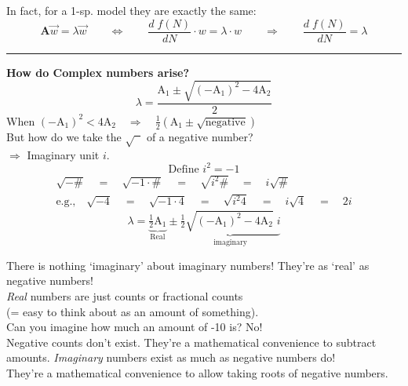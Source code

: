 \documentclass{article}
\newcommand{\ind}{\-\hspace{1cm}}
\begin{document}
In fact, for a 1-sp. model they are exactly the same:\\
\begin{equation*}
	\mathbf{A} \vec{w} = \lambda \vec{w} \qquad \Leftrightarrow \qquad \frac{d \; f(N)}{d N} \cdot  w  = \lambda \cdot w \qquad \Rightarrow \qquad \frac{d \; f(N)}{d N} = \lambda
\end{equation*}

\rule[0.5ex]{\linewidth}{1pt}

\textbf{How do Complex numbers arise?}\\
\begin{equation*}
	\lambda = \frac{\text{A}_1 \pm \sqrt{(-\text{A}_1)^2 - 4\text{A}_2}}{2}
\end{equation*}
When $(-\text{A}_1)^2 < 4 \text{A}_2  \quad \Rightarrow \quad \tfrac{1}{2}(\text{A}_1\pm \sqrt{\text{negative}})$\\
But how do we take the $\sqrt{\phantom{x}}$ of a negative number?\\
\ind $\Rightarrow$ Imaginary unit $i$.
\begin{equation*}
	\boxed{\text{Define }i^2 = -1}
\end{equation*}
\begin{align*}
	\sqrt{-\#} \quad = \quad \sqrt{-1 \cdot \#} \quad = \quad \sqrt{i^2\#} \quad = \quad i \sqrt{\#}\\
	\text{e.g.,} \quad	\sqrt{-4} \quad = \quad \sqrt{-1 \cdot 4} \quad = \quad \sqrt{i^2 4} \quad = \quad i \sqrt{4} \quad = \quad 2i
\end{align*}
\begin{equation*}
	\lambda = \underbrace{\tfrac{1}{2}\text{A}_1}_{\text{Real}} \pm \underbrace{\tfrac{1}{2}\sqrt{(-\text{A}_1)^2 - 4\text{A}_2} \; i}_{\text{imaginary}}
\end{equation*}

There is nothing `imaginary' about imaginary numbers!  They're as `real' as negative numbers!\\
\ind \emph{Real} numbers are just counts or fractional counts \\
\ind \ind (= easy to think about as an amount of something).\\
\ind \ind Can you imagine how much an amount of -10 is?  No!\\
\ind \ind Negative counts don't exist.  They're a mathematical convenience to subtract amounts.
\ind \emph{Imaginary} numbers exist as much as negative numbers do! \\
\ind \ind They're a mathematical convenience to allow taking roots of negative numbers.\\
\end{document}
